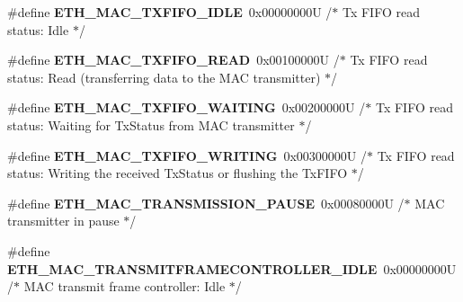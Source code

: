 \begin{DoxyCompactItemize}
\item 
\mbox{\label{group___h_a_l___e_t_h___aliased___defines_ga36e9938d6f099aab9f801d547d0a88a5}} 
\#define {\bfseries E\+T\+H\+\_\+\+M\+A\+C\+\_\+\+T\+X\+F\+I\+F\+O\+\_\+\+I\+D\+LE}~0x00000000\+U  /$\ast$ Tx F\+I\+F\+O read status\+: Idle $\ast$/
\item 
\mbox{\label{group___h_a_l___e_t_h___aliased___defines_ga162f3eb163f0fc63e0ef21f640ee3b35}} 
\#define {\bfseries E\+T\+H\+\_\+\+M\+A\+C\+\_\+\+T\+X\+F\+I\+F\+O\+\_\+\+R\+E\+AD}~0x00100000\+U  /$\ast$ Tx F\+I\+F\+O read status\+: Read (transferring data to the M\+A\+C transmitter) $\ast$/
\item 
\mbox{\label{group___h_a_l___e_t_h___aliased___defines_ga732d203562136a49e6fdfe08cbbdb007}} 
\#define {\bfseries E\+T\+H\+\_\+\+M\+A\+C\+\_\+\+T\+X\+F\+I\+F\+O\+\_\+\+W\+A\+I\+T\+I\+NG}~0x00200000\+U  /$\ast$ Tx F\+I\+F\+O read status\+: Waiting for Tx\+Status from M\+A\+C transmitter $\ast$/
\item 
\mbox{\label{group___h_a_l___e_t_h___aliased___defines_gaa98e266d20386f08f1e7d07924ae7fd8}} 
\#define {\bfseries E\+T\+H\+\_\+\+M\+A\+C\+\_\+\+T\+X\+F\+I\+F\+O\+\_\+\+W\+R\+I\+T\+I\+NG}~0x00300000\+U  /$\ast$ Tx F\+I\+F\+O read status\+: Writing the received Tx\+Status or flushing the Tx\+F\+I\+F\+O $\ast$/
\item 
\mbox{\label{group___h_a_l___e_t_h___aliased___defines_ga858c30b0c902a609fbf5e9de54c873fc}} 
\#define {\bfseries E\+T\+H\+\_\+\+M\+A\+C\+\_\+\+T\+R\+A\+N\+S\+M\+I\+S\+S\+I\+O\+N\+\_\+\+P\+A\+U\+SE}~0x00080000\+U  /$\ast$ M\+A\+C transmitter in pause $\ast$/
\item 
\mbox{\label{group___h_a_l___e_t_h___aliased___defines_ga3b6682322869b2f8ff8a34239418b229}} 
\#define {\bfseries E\+T\+H\+\_\+\+M\+A\+C\+\_\+\+T\+R\+A\+N\+S\+M\+I\+T\+F\+R\+A\+M\+E\+C\+O\+N\+T\+R\+O\+L\+L\+E\+R\+\_\+\+I\+D\+LE}~0x00000000\+U  /$\ast$ M\+A\+C transmit frame controller\+: Idle $\ast$/
\item 
\mbox{\label{group___h_a_l___e_t_h___aliased___defines_ga51af5af4f0244add557e29f1c1085c76}} 

\end{DoxyCompactItemize}
